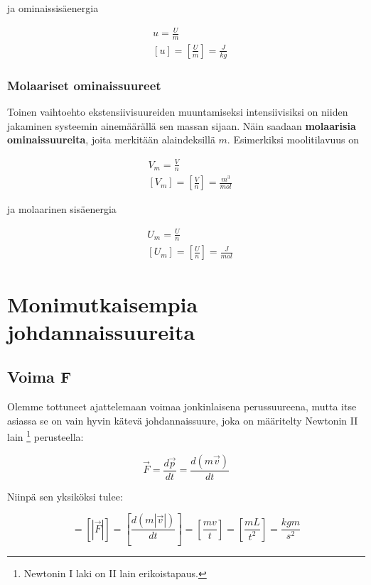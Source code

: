 \documentclass[12pt,a4paper,finnish]{book}
\begin{document}
ja ominaissisäenergia

\begin{align}
 &u = \frac{U}{m}\\
 &[u] = \left[\frac{U}{m}\right] = \frac{J}{kg}
\end{align}

\subsection{Molaariset ominaissuureet}

Toinen vaihtoehto ekstensiivisuureiden muuntamiseksi intensiivisiksi on niiden jakaminen systeemin 
ainemäärällä sen massan sijaan. Näin saadaan \textbf{molaarisia ominaissuureita}, joita merkitään 
alaindeksillä $m$. Esimerkiksi moolitilavuus on

\begin{align}
 &V_m = \frac{V}{n}\\
 &[V_m] = \left[\frac{V}{n}\right] = \frac{m^3}{mol}
\end{align}

ja molaarinen sisäenergia

\begin{align}
 &U_m = \frac{U}{n}\\
 &[U_m] = \left[\frac{U}{n}\right] = \frac{J}{mol}
\end{align}

\chapter{Monimutkaisempia johdannaissuureita} %

\section{Voima \={F}} %

Olemme tottuneet ajattelemaan voimaa jonkinlaisena perussuureena, mutta itse asiassa se on vain hyvin kätevä 
johdannaissuure, joka on määritelty Newtonin II lain \footnote{Newtonin I laki on II lain erikoistapaus.} perusteella:

\begin{equation}
 \vec{F} = \frac{d\vec{p}}{dt} = \frac{d(m\vec{v})}{dt}
\end{equation}

Niinpä sen yksiköksi tulee:

\begin{equation}
 [F] = [|\vec{F}|] = \left[\frac{d(m|\vec{v}|)}{dt}\right] = \left[\frac{mv}{t}\right] 
  = \left[\frac{mL}{t^2}\right] = \frac{kgm}{s^2}
\end{equation}
\end{document}
